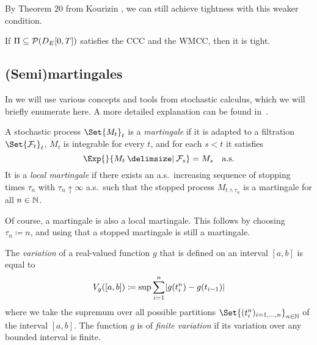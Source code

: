 By Theorem 20 from Kourizin \cite{kouritzinTightnessProbabilityMeasures2015}, we can still achieve tightness with this weaker condition.

\begin{theorem}\label{thm:ccc+wmcc=tight}
  If \( \Pi \subseteq \mathcal{P}(D_{E}[0,T]) \) satisfies the CCC and the WMCC, then it is tight.
\end{theorem}

\subsection{(Semi)martingales}

In  we will use various concepts and tools from stochastic calculus, which we will briefly enumerate here.
A more detailed explanation can be found in~\cite{klebanerIntroductionStochasticCalculus2012}.

\begin{definition}
  A stochastic process \(\Set{M_t}_{t}\) is a \textit{martingale} if it is adapted to a filtration \(\Set{\cF_t}_t\), \( M_t \) is integrable for every \(t\), and for each \( s < t \) it satisfies
  \begin{equation}
    \Exp{}{M_t \given \cF_s} = M_s \quad \text{a.s.}
  \end{equation}
  It is a \textit{local martingale} if there exists an a.s.\ increasing sequence of stopping times \( \tau_n \) with \( \tau_n \uparrow \infty \) a.s.\ such that the stopped process \( M_{t \land \tau_n} \) is a martingale for all \( n \in \mathbb{N} \). %
\end{definition}

Of course, a martingale is also a local martingale.
This follows by choosing \( \tau_n \coloneqq n \), and using that a stopped martingale is still a martingale.

\begin{definition}
  The \textit{variation} of a real-valued function \( g \) that is defined on an interval \( [a,b] \) is equal to
  \begin{equation}
    V_g([a,b]) \coloneqq \sup \sum_{i=1}^n \lvert g(t_i^n) - g(t_{i-1}) \rvert
  \end{equation}
  where we take the supremum over all possible partitions \(\Set{(t_i^n)_{i=1,\dots,n}}_{n\in\bN}\) of the interval \( [a,b] \).
  The function \( g \) is of \textit{finite variation} if its variation over any bounded interval is finite.
\end{definition}

